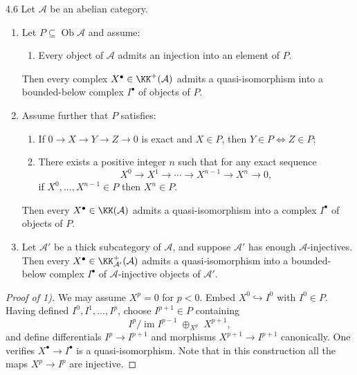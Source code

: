 \begin{booklemma}{4.6}\label{lem:1.4.6}
Let $\mathcal{A}$ be an abelian category.
\begin{enumerate}
\item[1)] Let $P\subseteq\operatorname{Ob}\mathcal{A}$ and assume:
\begin{enumerate}
\item[(i)] Every object of $\mathcal{A}$ admits an injection into an element of $P$.
\end{enumerate}
Then every complex $X^\bullet\in\KK^+(\mathcal{A})$ admits a quasi-isomorphism into a bounded-below complex $I^\bullet$ of objects of $P$.

\item[2)] Assume further that $P$ satisfies:
\begin{enumerate}
\item[(ii)] If $0\to X\to Y\to Z\to 0$ is exact and $X\in P$, then $Y\in P\iff Z\in P$;
\item[(iii)] There exists a positive integer $n$ such that for any exact sequence
\[
X^0\to X^1\to\cdots\to X^{n-1}\to X^n\to 0,
\]
if $X^0,\dots,X^{n-1}\in P$ then $X^n\in P$.
\end{enumerate}
Then every $X^\bullet\in\KK(\mathcal{A})$ admits a quasi-isomorphism into a complex $I^\bullet$ of objects of $P$.

\item[3)] Let $\mathcal{A}'$ be a thick subcategory of $\mathcal{A}$, and suppose $\mathcal{A}'$ has enough $\mathcal{A}$-injectives. Then every $X^\bullet\in\KK_{\mathcal{A}'}^+(\mathcal{A})$ admits a quasi-isomorphism into a bounded-below complex $I^\bullet$ of $\mathcal{A}$-injective objects of $\mathcal{A}'$.
\end{enumerate}
\end{booklemma}

\begin{proof}[Proof of 1)]
We may assume $X^p=0$ for $p<0$. Embed $X^0\hookrightarrow I^0$ with $I^0\in P$. Having defined $I^0,I^1,\dots,I^p$, choose $I^{p+1}\in P$ containing
\[
I^p\big/\operatorname{im}I^{p-1}\;\oplus_{X^p}\;X^{p+1},
\]
and define differentials $I^p\to I^{p+1}$ and morphisms $X^{p+1}\to I^{p+1}$ canonically. One verifies $X^\bullet\to I^\bullet$ is a quasi-isomorphism. Note that in this construction all the maps $X^p\to I^p$ are injective.
\end{proof}

